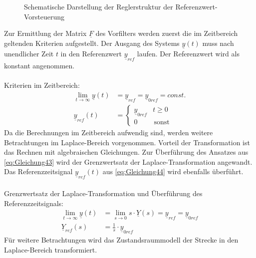 \begin{figure}[H]
    \centering
    \caption[Reglerstruktur Vorsteuerung]{Schematische Darstellung der Reglerstruktur der Referenzwert-Vorsteuerung}
    \label{fig:Bild9}
\end{figure}

Zur Ermittlung der Matrix $\underline{F}$ des Vorfilters werden zuerst die im Zeitbereich geltenden Kriterien aufgestellt. Der Ausgang des Systems $\underline{y}(t)$ muss nach unendlicher Zeit $t$ in den Referenzwert $\underline{y}_{ref}$ laufen. Der Referenzwert wird als konstant angenommen.\\\\
Kriterien im Zeitbereich:
\begin{align}
    \lim_{t \to \infty} \underline{y}(t) &= \underline{y}_{ref} = \underline{y}_{0ref} = const. \label{eq:Gleichung43}\\
    \underline{y}_{ref}(t) &=
    \begin{cases}
        \underline{y}_{0ref} & t \geq 0 \\
        0 & \, \text{sonst}
    \end{cases} \label{eq:Gleichung44}
\end{align}
\newline
Da die Berechnungen im Zeitbereich aufwendig sind, werden weitere Betrachtungen im Laplace-Bereich vorgenommen. Vorteil der Transformation ist das Rechnen mit algebraischen Gleichungen. Zur Überführung des Ansatzes aus \autoref{eq:Gleichung43} wird der Grenzwertsatz der Laplace-Transformation angewandt. Das Referenzzeitsignal $\underline{y}_{ref}(t)$ aus \autoref{eq:Gleichung44} wird ebenfalls überführt.\\\\
Grenzwertsatz der Laplace-Transformation und Überführung des Referenzzeitsignals:
\begin{align}
    \lim_{t \to \infty} \underline{y}(t) &= \lim_{s \to 0} s\cdot\underline{Y}(s) = \underline{y}_{ref} = \underline{y}_{0ref} \label{eq:Gleichung45}\\
    \underline{Y}_{ref}(s) &= \frac{1}{s}\cdot\underline{y}_{0ref} \label{eq:Gleichung46}
\end{align}
\newline
Für weitere Betrachtungen wird das Zustandsraummodell der Strecke in den Laplace-Bereich transformiert.

